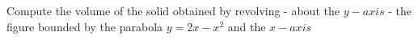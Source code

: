 
%
%
%
%
% 
% 

\question Compute the volume of the solid obtained by revolving - about the $y-axis$ -
the figure bounded by the parabola $y=2x-x^2$ and the $x-axis$

\insertQR{}

